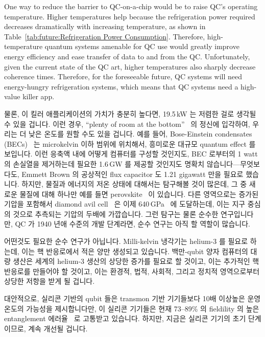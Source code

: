 One way to reduce the barrier to QC-on-a-chip would be to raise
QC's operating temperature.
Higher temperatures help because the refrigeration power required
decreases dramatically with increasing temperature, as shown in
Table~\ref{tab:future:Refrigeration Power Consumption}.
Therefore, high-temperature quantum systems amenable for QC use would
greatly improve energy efficiency and ease transfer of data to and from
the QC.
Unfortunately, given the current state of the QC art, higher
temperatures also sharply decrease coherence times.
Therefore, for the foreseeable future, QC systems will need
energy-hungry refrigeration systems, which means that QC
systems need a high-value killer app.
\fi

물론, 이 킬러 애플리케이션의 가치가 충분히 높다면, 19.5\,kW 는 저렴한 걸로
생각될 수 있을 겁니다.
이런 경우,
``plenty of room at the bottom''~\cite{RichardPFeynman1959RoomAtBottom} 의
정신에 입각하여, 우리는 더 낮은 온도를 원할 수도 있을 겁니다.
예를 들어, Bose-Einstein condensates
(BECs)~\cite{NIST2001BoseEinsteinCondensate} 는 microkelvin 이하 범위에
위치해서, 흥미로운 대규모 quantum effect 를 보입니다.
이런 응축액 내에 어떻게 컴퓨터를 구성할 것인지도, BEC 로부터의 1 watt 의
손실열을 제거하는데 필요한 1.6\,GW 를 제공할 것인지도 명확치
않습니다---무엇보다도, Emmett Brown 의 공상적인 flux capacitor 도 1.21 gigawatt
만을 필요로 했습니다.
하지만, 물질과 에너지의 저온 상태에 대해서는 탐구해볼 것이 많은데, 그 중 새로운
물질에 대해 하나만 예를 들면
perovskite~\cite{ZhengChen2016PerovskiteQDMOFthinFilm} 이 있습니다.
다른 영역으로는 증가된 기압을 포함해서 diamond avil
cell~\cite{Weir1959DiamondAnvilCell} 은 이제
640\,GPa~\cite{LeonidDubrovinsky2012640GPaDiamondAnvilCell} 에 도달하는데, 이는
지구 중심의 것으로 추측되는 기압의 두배에 가깝습니다.
그런 탐구는 물론 순수한 연구입니다만, QC 가 1940 년애 수준의 개발 단계라면,
순수 연구는 아직 할 역할이 많습니다.

어떤것도 필요한 순수 연구가 아닙니다.
Milli-kelvin 냉각기는 helium-3 를 필요로 하는데, 이는 핵 반응로에서 적은 양만
생성되고 있습니다.
백만-qubit 양자 컴퓨터의 대량 생산은 세계의 helium-3 생산의 상당한 증가를
필요로 할 것이고, 이는 추가적인 핵 반응로를 만들어야 할 것이고, 이는 환경적,
법적, 사회적, 그리고 정치적 영역으로부터 상당한 저항을 받게 될 겁니다.

대안적으로, 실리콘 기반의 qubit 들은 transmon 기반 기기들보다 10배 이상높은
운영 온도의 가능성을 제시합니다만, 이 실리콘 기기들은 현재 73--89\% 의
fieldility 의 높은 entanglement 에러율~\cite{TFWatson2017SiliconQubit} 로
고통받고 있습니다.
하지만, 지금은 실리콘 기기의 초기 단계이므로, 계속 개선될 겁니다.

